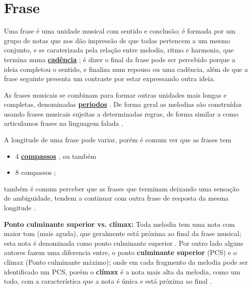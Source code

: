 \section{Frase}
\label{sec:Frase}
Uma frase é uma unidade musical com sentido e conclusão;
é formada por um grupo de notas que nos dão impressão de que todas pertencem a um mesmo conjunto,
e se caraterizada pela relação entre melodia, ritmo e harmonia,
que termina numa \hyperref[sec:Cadencia]{\textbf{cadência}} \cite[pp. 624]{latham2008diccionario} \cite[pp. 335]{medteoria} \cite[pp. 34]{bennett1993elementos};
é dizer o final da frase pode ser percebido porque a ideia completou o sentido, 
e finaliza num repouso ou uma cadência, além de que a frase seguinte presenta um contraste por estar expressando outra ideia.


As frases musicais se combinam para formar outras unidades mais longas e completas, 
denominadas \hyperref[sec:Periodo]{\textbf{periodos}} \cite[pp. 624]{latham2008diccionario}.
De forma geral as melodias são construídas usando frases musicais sujeitas a determinadas
regras, de forma similar a como articulamos frases na linguagem falada \cite[pp. 334]{medteoria}.


A longitude de uma frase pode variar, 
porém é comum ver que as frases tem
\begin{itemize}
\item 4 \hyperref[sec:compaso]{\textbf{compassos}} \cite[pp. 624]{latham2008diccionario} \cite[pp. 34]{bennett1993elementos}, 
ou também 
\item 8 compassos  \cite[pp. 335]{medteoria} \cite[pp. 34]{bennett1993elementos};
\end{itemize}
também é comum perceber que as frases que terminam deixando uma sensação de ambiguidade, 
tendem a continuar com outra frase de resposta da mesma longitude \cite[pp. 624]{latham2008diccionario}.


\begin{tcbinformation}
\label{ref:PontoCulminanteSuperior} 
\textbf{Ponto culminante superior vs. clímax:}
Toda melodia tem uma nota com maior tom (mais aguda), que geralmente está próxima ao final da frase musical;
esta nota é denominada como ponto culminante superior \cite[pp. 336]{medteoria}.
Por outro lado alguns autores fazem uma diferencia entre,
o ponto \textbf{culminante superior} (PCS) e o clímax (Ponto culminante máximo);
onde em cada fragmento da melodia pode ser identificado um PCS,
porém o \textbf{clímax} é a nota mais alta da melodia, como um todo, 
com a característica que a nota é única e está próxima ao final \cite[pp. 12]{melos2012} \cite{HARTMANN2013} \cite[pp. 50]{holland2013music}.
\label{ref:climax}
\end{tcbinformation} 


